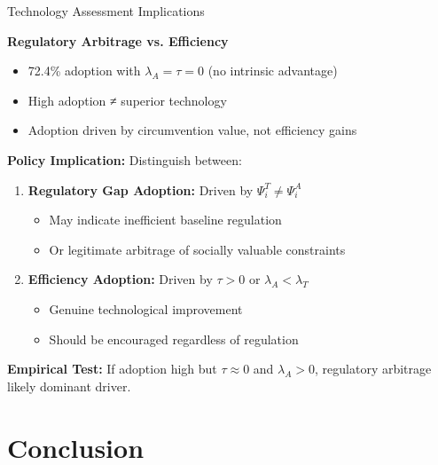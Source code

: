 \documentclass[aspectratio=169]{beamer}
\begin{document}
\begin{frame}{Technology Assessment Implications}
    
    \textbf{Regulatory Arbitrage vs. Efficiency}
    
    \vspace{0.3cm}
    \begin{itemize}
        \item 72.4\% adoption with $\lambda_A = \tau = 0$ (no intrinsic advantage)
        \item High adoption ≠ superior technology
        \item Adoption driven by circumvention value, not efficiency gains
    \end{itemize}
    
    \vspace{0.3cm}
    \textbf{Policy Implication:} Distinguish between:
    \begin{enumerate}
        \item \textbf{Regulatory Gap Adoption:} Driven by $\Psi_i^T \neq \Psi_i^A$
        \begin{itemize}
            \item May indicate inefficient baseline regulation
            \item Or legitimate arbitrage of socially valuable constraints
        \end{itemize}
        
        \item \textbf{Efficiency Adoption:} Driven by $\tau > 0$ or $\lambda_A < \lambda_T$
        \begin{itemize}
            \item Genuine technological improvement
            \item Should be encouraged regardless of regulation
        \end{itemize}
    \end{enumerate}
    
    \vspace{0.3cm}
    \textbf{Empirical Test:} If adoption high but $\tau \approx 0$ and $\lambda_A > 0$, regulatory arbitrage likely dominant driver.

\end{frame}

\section{Conclusion}
\end{document}
